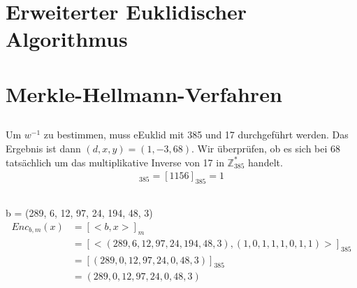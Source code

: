\documentclass{../crypto}
\begin{document}
\section{Erweiterter Euklidischer Algorithmus}

\subsection{}
\subsection{}
\subsection{}

\section{Merkle-Hellmann-Verfahren}

%
%
%
%
%

\subsection{}
Um $w^{-1}$ zu bestimmen, muss eEuklid mit 385 und 17 durchgeführt werden. Das Ergebnis ist dann $(d,x,y) = (1,-3,68)$. Wir überprüfen, ob es sich bei 68 tatsächlich um das multiplikative Inverse von 17 in $\mathds{Z}_{385}^*$ handelt. \begin{align*}
[17 \cdot 68]_{385} = [1156]_{385} = 1
\end{align*}
\subsection{}
b = (289, 6, 12, 97, 24, 194, 48, 3)
\begin{align*}
Enc_{b,m}(x) & = [<b,x>]_m \\
&= [<(289, 6, 12, 97, 24, 194, 48, 3),(1, 0, 1, 1, 1, 0, 1, 1)>]_{385} \\
&= [(289, 0, 12, 97, 24, 0, 48, 3)]_{385} \\
&= (289, 0, 12, 97, 24, 0, 48, 3)
\end{align*}
\subsection{}
\end{document}
